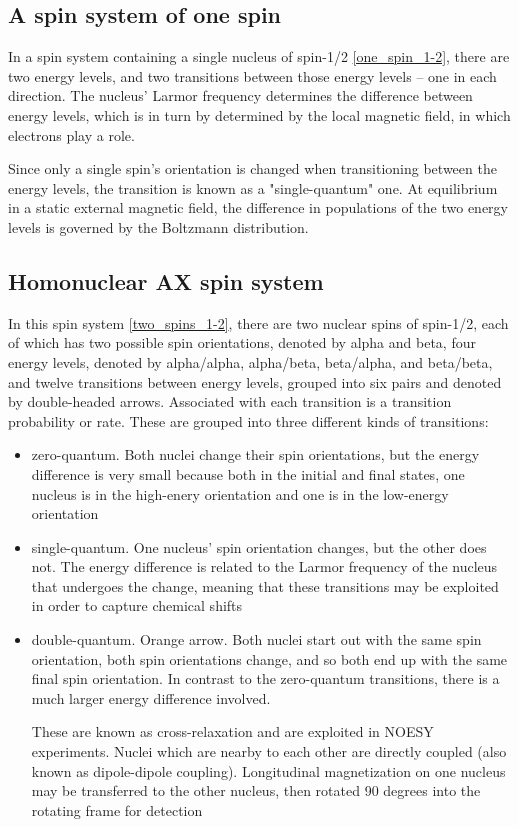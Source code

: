 \subsection*{A spin system of one spin}

In a spin system containing a single nucleus of spin-1/2 \ref{one_spin_1-2},
there are two energy levels, and two transitions between those energy levels
-- one in each direction.  The nucleus' Larmor frequency determines the 
difference between energy levels, which is in turn by determined by the 
local magnetic field, in which electrons play a role.

Since only a single spin's orientation is changed when transitioning between
the energy levels, the transition is known as a "single-quantum" one.
At equilibrium in a static external magnetic field, the difference in 
populations of the two energy levels is governed by the Boltzmann distribution.


\subsection*{Homonuclear AX spin system}

In this spin system \ref{two_spins_1-2}, there are
two nuclear spins of spin-1/2, each of which has two possible spin orientations,
denoted by alpha and beta,
four energy levels, denoted by alpha/alpha, alpha/beta, beta/alpha, and beta/beta, and
twelve transitions between energy levels, grouped into six pairs and denoted
by double-headed arrows.  Associated with each transition is a transition
probability or rate.  These are grouped into three different kinds of transitions:

\begin{itemize} 
  \item zero-quantum.  Both nuclei change their spin orientations, 
     but the energy difference is very small because both in the initial and
     final states, one nucleus is in the high-enery orientation and one is in
     the low-energy orientation

  \item single-quantum.  One nucleus' spin orientation changes, but
     the other does not.  The energy difference is related to the Larmor frequency
     of the nucleus that undergoes the change, meaning that these transitions may
     be exploited in order to capture chemical shifts

  \item double-quantum.  Orange arrow.  Both nuclei start out with the same spin
     orientation, both spin orientations change, and so both end up with the
     same final spin orientation.  In contrast to the zero-quantum transitions,
     there is a much larger energy difference involved.

     These are known as cross-relaxation and are exploited in 
     NOESY experiments.  Nuclei which are nearby to each other are directly
     coupled (also known as dipole-dipole coupling).  Longitudinal magnetization
     on one nucleus may be transferred to the other nucleus, then rotated 90
     degrees into the rotating frame for detection
\end{itemize}
   
